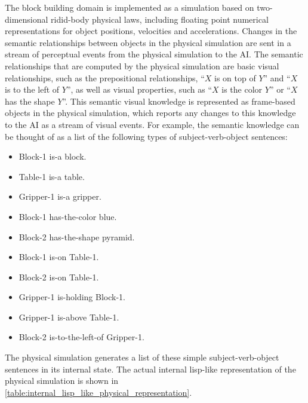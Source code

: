 The block building domain is implemented as a simulation based on
two-dimensional ridid-body physical laws, including floating point
numerical representations for object positions, velocities and
accelerations.  Changes in the semantic relationships between objects
in the physical simulation are sent in a stream of perceptual events
from the physical simulation to the AI.  The semantic relationships
that are computed by the physical simulation are basic visual
relationships, such as the prepositional relationships, ``$X$ is on
top of $Y$'' and ``$X$ is to the left of $Y$'', as well as visual
properties, such as ``$X$ is the color $Y$'' or ``$X$ has the shape
$Y$''.  This semantic visual knowledge is represented as frame-based
objects in the physical simulation, which reports any changes to this
knowledge to the AI as a stream of visual events.  For example, the
semantic knowledge can be thought of as a list of the following types
of subject-verb-object sentences:
\begin{itemize}
\item Block-1 is-a block.
\item Table-1 is-a table.
\item Gripper-1 is-a gripper.
\item Block-1 has-the-color blue.
\item Block-2 has-the-shape pyramid.
\item Block-1 is-on Table-1.
\item Block-2 is-on Table-1.
\item Gripper-1 is-holding Block-1.
\item Gripper-1 is-above Table-1.
\item Block-2 is-to-the-left-of Gripper-1.
\end{itemize}
The physical simulation generates a list of these simple
subject-verb-object sentences in its internal state.  The actual
internal lisp-like representation of the physical simulation is shown
in \autoref{table:internal_lisp_like_physical_representation}.
